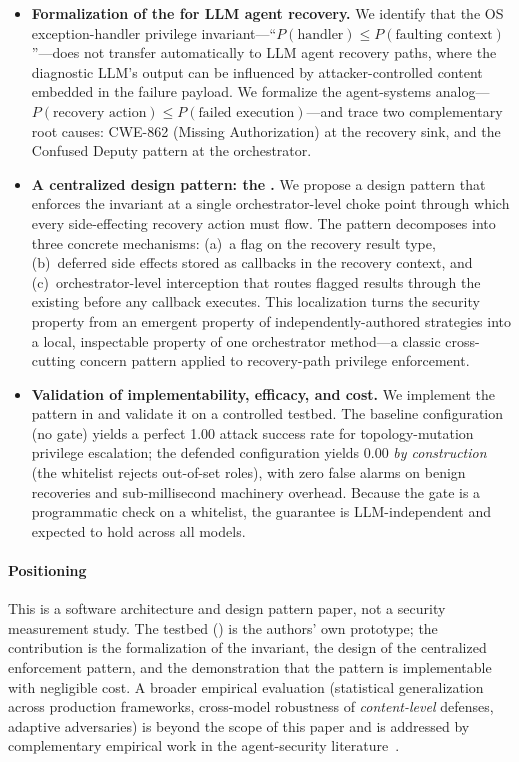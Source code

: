 \begin{itemize}[leftmargin=*]
    \item \textbf{Formalization of the \privinv{} for LLM agent recovery.} We identify that the OS exception-handler privilege invariant---``$P(\text{handler}) \leq P(\text{faulting context})$''---does not transfer automatically to LLM agent recovery paths, where the diagnostic LLM's output can be influenced by attacker-controlled content embedded in the failure payload. We formalize the agent-systems analog---$P(\text{recovery action}) \leq P(\text{failed execution})$---and trace two complementary root causes: CWE-862 (Missing Authorization) at the recovery sink, and the Confused Deputy pattern at the orchestrator.

    \item \textbf{A centralized design pattern: the \reauthgate{}.} We propose a design pattern that enforces the invariant at a single orchestrator-level choke point through which every side-effecting recovery action must flow. The pattern decomposes into three concrete mechanisms: (a)~a  flag on the recovery result type, (b)~deferred side effects stored as callbacks in the recovery context, and (c)~orchestrator-level interception that routes flagged results through the existing  before any callback executes. This localization turns the security property from an emergent property of independently-authored strategies into a local, inspectable property of one orchestrator method---a classic cross-cutting concern pattern applied to recovery-path privilege enforcement.

    \item \textbf{Validation of implementability, efficacy, and cost.} We implement the pattern in \system{} and validate it on a controlled testbed. The baseline configuration (no gate) yields a perfect 1.00 attack success rate for topology-mutation privilege escalation; the defended configuration yields 0.00 \emph{by construction} (the whitelist rejects out-of-set roles), with zero false alarms on benign recoveries and sub-millisecond machinery overhead. Because the gate is a programmatic check on a whitelist, the guarantee is LLM-independent and expected to hold across all models.
\end{itemize}

\paragraph{Positioning}
This is a software architecture and design pattern paper, not a security measurement study. The testbed (\system{}) is the authors' own prototype; the contribution is the formalization of the invariant, the design of the centralized enforcement pattern, and the demonstration that the pattern is implementable with negligible cost. A broader empirical evaluation (statistical generalization across production frameworks, cross-model robustness of \emph{content-level} defenses, adaptive adversaries) is beyond the scope of this paper and is addressed by complementary empirical work in the agent-security literature~\cite{debenedetti2025camel,zhan2025adaptive}.

